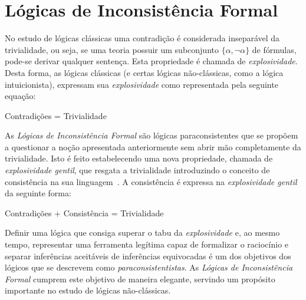 \chapter{Lógicas de Inconsistência Formal}
\label{cap:LFIs}
No estudo de lógicas clássicas uma contradição é considerada inseparável da trivialidade, ou seja, se uma teoria possuir um subconjunto $\{\alpha,\neg \alpha\}$ de fórmulas, pode-se derivar qualquer sentença. Esta propriedade é chamada de \textit{explosividade}. Desta forma, as lógicas clássicas (e certas lógicas não-clássicas, como a lógica intuicionista), expressam sua \textit{explosividade} como representada pela seguinte equação: 
\begin{center}
    Contradições = Trivialidade
\end{center}
As \textit{Lógicas de Inconsistência Formal} são lógicas paraconsistentes que se propõem a questionar a noção apresentada anteriormente sem abrir mão completamente da trivialidade. Isto é feito estabelecendo uma nova propriedade, chamada de \textit{explosividade gentil}, que resgata a trivialidade introduzindo o conceito de consistência na sua linguagem~\cite{carnielli2007}. A consistência é expressa na \textit{explosividade gentil} da seguinte forma:
\begin{center}
    Contradições + Consistência = Trivialidade
\end{center}
Definir uma lógica que consiga superar o tabu da \textit{explosividade} e, ao mesmo tempo, representar uma ferramenta legítima capaz de formalizar o raciocínio e separar inferências aceitáveis de inferências equivocadas é um dos objetivos dos lógicos que se descrevem como \textit{paraconsistentistas}. As \textit{Lógicas de Inconsistência Formal} cumprem este objetivo de maneira elegante, servindo um propósito importante no estudo de lógicas não-clássicas.

